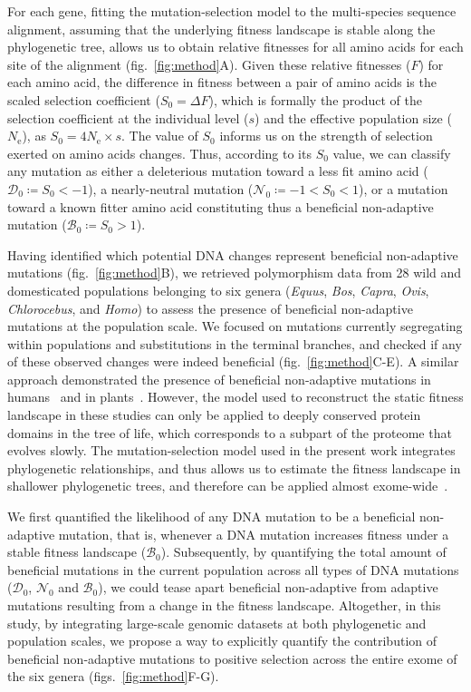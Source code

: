 \documentclass{article}
\newcommand{\Ne}{N_{\text{e}}}
\newcommand{\Sphy}{S_{0}}
\newcommand{\SphyDel}{\mathcal{D}_0}
\newcommand{\SphyNeu}{\mathcal{N}_0}
\newcommand{\SphyBen}{\mathcal{B}_0}
\begin{document}
    For each gene, fitting the mutation-selection model to the multi-species sequence alignment, assuming that the underlying fitness landscape is stable along the phylogenetic tree, allows us to obtain relative fitnesses for all amino acids for each site of the alignment (fig.~\ref{fig:method}A).
    Given these relative fitnesses ($F$) for each amino acid, the difference in fitness between a pair of amino acids is the scaled selection coefficient ($\Sphy = \Delta F$), which is formally the product of the selection coefficient at the individual level ($s$) and the effective population size ($\Ne$), as $\Sphy = 4 \Ne \times s$. The value of $\Sphy$ informs us on the strength of selection exerted on amino acids changes.
    Thus, according to its $\Sphy$ value, we can classify any mutation as either a deleterious mutation toward a less fit amino acid ($\SphyDel \coloneqq \Sphy < -1$), a nearly-neutral mutation ($\SphyNeu \coloneqq -1 < \Sphy <1$), or a mutation toward a known fitter amino acid constituting thus a beneficial non-adaptive mutation ($\SphyBen \coloneqq \Sphy > 1$).

    Having identified which potential DNA changes represent beneficial non-adaptive mutations (fig.~\ref{fig:method}B), we retrieved polymorphism data from 28 wild and domesticated populations belonging to six genera (\textit{Equus}, \textit{Bos}, \textit{Capra}, \textit{Ovis}, \textit{Chlorocebus}, and \textit{Homo}) to assess the presence of beneficial non-adaptive mutations at the population scale.
    We focused on mutations currently segregating within populations and substitutions in the terminal branches, and checked if any of these observed changes were indeed beneficial (fig.~\ref{fig:method}C-E).
    A similar approach demonstrated the presence of beneficial non-adaptive mutations in humans~\cite{moses_inferring_2009, fischer_germline_2011} and in plants~\cite{chen_hunting_2021}.
    However, the model used to reconstruct the static fitness landscape in these studies can only be applied to deeply conserved protein domains in the tree of life, which corresponds to a subpart of the proteome that evolves slowly.
    The mutation-selection model used in the present work integrates phylogenetic relationships, and thus allows us to estimate the fitness landscape in shallower phylogenetic trees, and therefore can be applied almost exome-wide~\cite{rodrigue_mutationselection_2010}.

    We first quantified the likelihood of any DNA mutation to be a beneficial non-adaptive mutation, that is, whenever a DNA mutation increases fitness under a stable fitness landscape ($\SphyBen$).
    Subsequently, by quantifying the total amount of beneficial mutations in the current population across all types of DNA mutations ($\SphyDel$, $\SphyNeu$ and $\SphyBen$), we could tease apart beneficial non-adaptive from adaptive mutations resulting from a change in the fitness landscape.
    Altogether, in this study, by integrating large-scale genomic datasets at both phylogenetic and population scales, we propose a way to explicitly quantify the contribution of beneficial non-adaptive mutations to positive selection across the entire exome of the six genera (figs.~\ref{fig:method}F-G).
\end{document}
